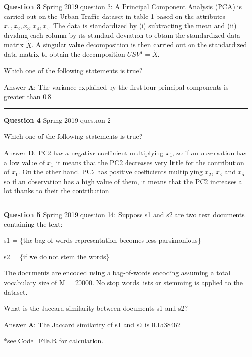 \documentclass[
]{article}
\begin{document}
\textbf{Question 3} \textbar{} Spring 2019 question 3: A Principal
Component Analysis (PCA) is carried out on the Urban Traffic dataset in
table 1 based on the attributes \({x_1}, {x_2}, {x_3}, {x_4}, {x_5}\).
The data is standardized by (i) subtracting the mean and (ii) dividing
each column by its standard deviation to obtain the standardized data
matrix \(\tilde{X}\). A singular value decomposition is then carried out
on the standardized data matrix to obtain the decomposition
\(US{V^T} = {\tilde{X}}\).

Which one of the following statements is true?

Answer \textbf{A}: The variance explained by the first four principal
components is greater than 0.8

\begin{center}\rule{0.5\linewidth}{0.5pt}\end{center}

\textbf{Question 4} \textbar{} Spring 2019 question 2

Which one of the following statements is true?

Answer \textbf{D}: PC2 has a negative coefficient multiplying \(x_1\),
so if an observation has a low value of \(x_1\) it means that the PC2
decreases very little for the contribution of \(x_1\). On the other
hand, PC2 has positive coefficients multiplying \(x_2\), \(x_3\) and
\(x_5\) so if an observation has a high value of them, it means that the
PC2 increases a lot thanks to their the contribution

\begin{center}\rule{0.5\linewidth}{0.5pt}\end{center}

\textbf{Question 5} \textbar{} Spring 2019 question 14: Suppose s1 and
s2 are two text documents containing the text:

s1 = \{the bag of words representation becomes less parsimonious\}

s2 = \{if we do not stem the words\}

The documents are encoded using a bag-of-words encoding assuming a total
vocabulary size of M = 20000. No stop words lists or stemming is applied
to the dataset.

What is the Jaccard similarity between documents s1 and s2?

Answer \textbf{A}: The Jaccard similarity of s1 and s2 is 0.1538462

*see Code\_File.R for calculation.

\begin{center}\rule{0.5\linewidth}{0.5pt}\end{center}
\end{document}

